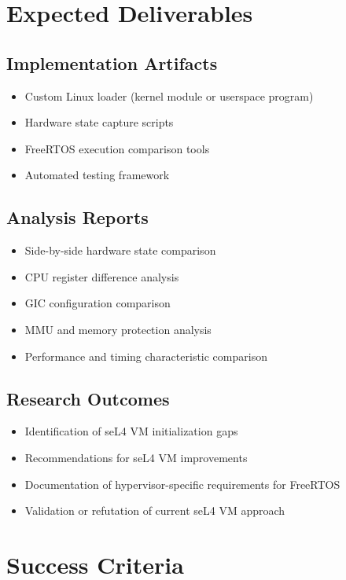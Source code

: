 \documentclass[11pt,a4paper]{article}
\begin{document}
\section{Expected Deliverables}

\subsection{Implementation Artifacts}
\begin{itemize}
    \item Custom Linux loader (kernel module or userspace program)
    \item Hardware state capture scripts
    \item FreeRTOS execution comparison tools
    \item Automated testing framework
\end{itemize}

\subsection{Analysis Reports}
\begin{itemize}
    \item Side-by-side hardware state comparison
    \item CPU register difference analysis
    \item GIC configuration comparison
    \item MMU and memory protection analysis
    \item Performance and timing characteristic comparison
\end{itemize}

\subsection{Research Outcomes}
\begin{itemize}
    \item Identification of seL4 VM initialization gaps
    \item Recommendations for seL4 VM improvements
    \item Documentation of hypervisor-specific requirements for FreeRTOS
    \item Validation or refutation of current seL4 VM approach
\end{itemize}

\section{Success Criteria}
\end{document}
